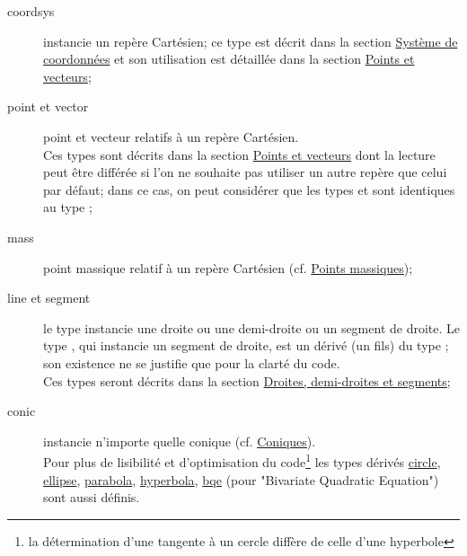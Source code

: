 \documentclass[pdftex]{article}
\begin{document}
\begin{description}
\item[coordsys] instancie un repère Cartésien;
  ce type est décrit dans la section
  \href{#section.coordsys}{Système de coordonnées} et son
  utilisation est détaillée dans la section
  \href{#section.point}{Points et vecteurs};
\item[point \textmd{et} vector] point et vecteur relatifs à un repère Cartésien.\\
  Ces types sont décrits dans la section
  \href{#section.point}{Points et vecteurs} dont la lecture peut
  être différée si l'on ne souhaite pas utiliser un autre repère que
  celui par défaut; dans ce cas, on peut considérer que les types
   et  sont identiques au type ;
\item[mass] point massique relatif à un repère Cartésien
  (cf. \href{#section.mass}{Points massiques});
\item[line \textmd{et} segment] le type
   instancie une droite ou une demi-droite ou un segment
  de droite. Le type , qui instancie un
  segment de droite, est un dérivé (un fils) du type ; son
  existence ne se justifie que pour la clarté du code.\\
  Ces types seront décrits dans la section
  \href{#section.line}{Droites, demi-droites et segments};
\item[conic] instancie n'importe quelle
  conique (cf. \href{#section.conic}{Coniques}).\\
  Pour plus de lisibilité et d'optimisation du code\footnote{la détermination
    d'une tangente à un cercle diffère de celle d'une hyperbole} les types dérivés
  \href{#subsection.circle}{circle},
  \href{#subsection.ellipse}{ellipse},
  \href{#subsection.parabola}{parabola},
  \href{#subsection.hyperbola}{hyperbola},
  \href{#subsubsection.bqe}{bqe} (pour "Bivariate Quadratic
  Equation") sont aussi définis.


\end{description}
\end{document}

